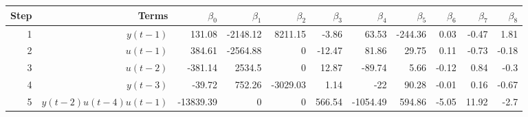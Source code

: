 \begin{tabular}{rrrrrrrrrrr}
Step & Terms & $\beta_{0}$ & $\beta_{1}$ & $\beta_{2}$ & $\beta_{3}$ & $\beta_{4}$ & $\beta_{5}$ & $\beta_{6}$ & $\beta_{7}$ & $\beta_{8}$ \\ 
\hline 
1 & $y(t-1)$ & 131.08 & -2148.12 & 8211.15 & -3.86 & 63.53 & -244.36 & 0.03 & -0.47 & 1.81 \\ 
2 & $u(t-1)$ & 384.61 & -2564.88 & 0 & -12.47 & 81.86 & 29.75 & 0.11 & -0.73 & -0.18 \\ 
3 & $u(t-2)$ & -381.14 & 2534.5 & 0 & 12.87 & -89.74 & 5.66 & -0.12 & 0.84 & -0.3 \\ 
4 & $y(t-3)$ & -39.72 & 752.26 & -3029.03 & 1.14 & -22 & 90.28 & -0.01 & 0.16 & -0.67 \\ 
5 & $y(t-2)u(t-4)u(t-1)$ & -13839.39 & 0 & 0 & 566.54 & -1054.49 & 594.86 & -5.05 & 11.92 & -2.7 \\ 
\hline 
\end{tabular}